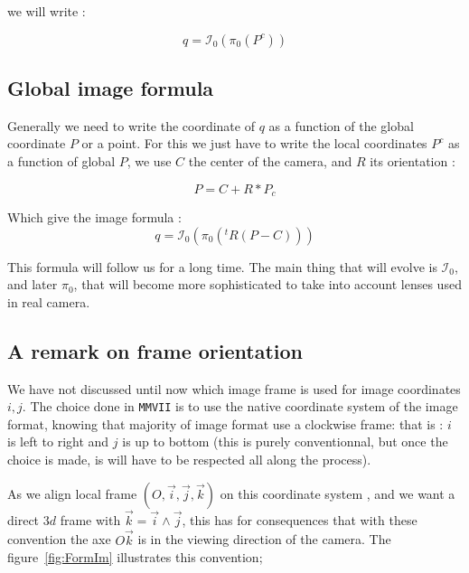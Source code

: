 we will write :

\begin{equation}
	q  =   \mathcal{I}_0 (\pi_0 (P^c))
\end{equation}


\subsection{Global image formula}

Generally we need to write the coordinate of $q$ as a function of the global coordinate $P$ or a point.
For this we just have to write the local coordinates $P^c$ as a function of global $P$, 
we use $C$ the center of the camera, and $R$ its orientation :

\begin{equation}
	P =  C+ R *P_c
\end{equation}

Which give the image formula :
\begin{equation}
	q  =   \mathcal{I}_0 (\pi_0 (^t R (P - C))) \label{FormImage0}
\end{equation}

This formula will follow us for a long time. The main thing that will evolve is $\mathcal{I}_0$,
and later $\pi_0$,
that will become more sophisticated to take into account lenses used in real camera.


\subsection{A remark on frame orientation}

We have not discussed until now which image frame is used for image coordinates $i,j$.
The choice done in {\tt MMVII} is to use the native coordinate system of the image format,
knowing that majority of image format use a clockwise frame: 
that is : $i$ is left to right and $j$ is up to bottom (this is purely conventionnal, but once the
choice is made, is will have to be respected all along the process).

As we align local frame $(O,\vec{i},\vec{j},\vec{k})$  on this coordinate system ,
and we want a direct $3d$ frame with $\vec{k} = \vec{i} \wedge \vec{j} $, this
has for consequences that with these convention the axe $O\vec{k}$ is in the viewing direction of the
camera.  The figure~\ref{fig:FormIm} illustrates this convention;


